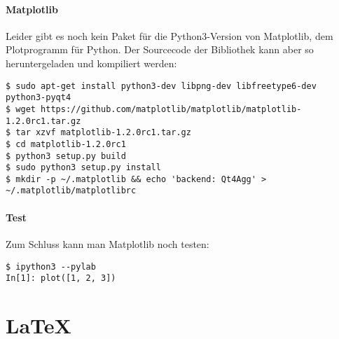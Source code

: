 \subsubsection{Matplotlib}
Leider gibt es noch kein Paket für die Python3-Version von Matplotlib, dem Plotprogramm für Python.
Der Sourcecode der Bibliothek kann aber so heruntergeladen und kompiliert werden:
\begin{verbatim}
$ sudo apt-get install python3-dev libpng-dev libfreetype6-dev python3-pyqt4
$ wget https://github.com/matplotlib/matplotlib/matplotlib-1.2.0rc1.tar.gz
$ tar xzvf matplotlib-1.2.0rc1.tar.gz
$ cd matplotlib-1.2.0rc1
$ python3 setup.py build
$ sudo python3 setup.py install
$ mkdir -p ~/.matplotlib && echo 'backend: Qt4Agg' > ~/.matplotlib/matplotlibrc
\end{verbatim}

\subsubsection{Test}
Zum Schluss kann man Matplotlib noch testen:
\begin{verbatim}
$ ipython3 --pylab
In[1]: plot([1, 2, 3])
\end{verbatim}





\chapter{LaTeX}

